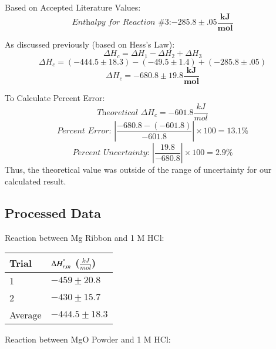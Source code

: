\documentclass[12pt]{article}
\begin{document}
Based on Accepted Literature Values:
\begin{equation*}
\textit{Enthalpy for Reaction \#3:} \mathbf{-285.8 \pm .05 \frac{kJ}{mol}}
\end{equation*}

As discussed previously (based on Hess's Law):
\begin{equation*}
\label{eq:enthalpy-sum}
\Delta H_c = \Delta H_1 - \Delta H_2 + \Delta H_3
\end{equation*}
\begin{equation*}
\Delta H_c = (-444.5 \pm 18.3) - (-49.5 \pm 1.4) + (-285.8 \pm .05)
\end{equation*}
\begin{equation*}
\Delta H_c = \mathbf{-680.8 \pm 19.8 \frac{kJ}{mol}}
\end{equation*}

To Calculate Percent Error:
\begin{equation*}
\textit{Theoretical } \Delta H_c = -601.8 \frac{kJ}{mol}
\end{equation*}
\begin{equation*}
\textit{Percent Error: } \left|\frac{-680.8 - (-601.8)}{-601.8}\right| \times 100 = \mathbf{13.1\%}
\end{equation*}
\begin{equation*}
\textit{Percent Uncertainty: } \left|\frac{19.8}{-680.8}\right| \times 100 = \mathbf{2.9\%}
\end{equation*}
Thus, the theoretical value was outside of the range of uncertainty for our calculated result.

\subsection{Processed Data}
Reaction between Mg Ribbon and 1 M HCl:

	\begin{center}
	\begin{tabular}{ |m{4cm}|m{4cm}| }
	\hline
	Trial & $\Delta H^{\degree}_{rxn}$ ($\frac{kJ}{mol}$) \\
	\hline
	1 & $-459 \pm 20.8$ \\
	2 & $-430 \pm 15.7$ \\
	\hline
	Average & $-444.5 \pm 18.3$ \\
	 \hline
	\end{tabular}
	\end{center}

Reaction between MgO Powder and 1 M HCl:
\end{document}
